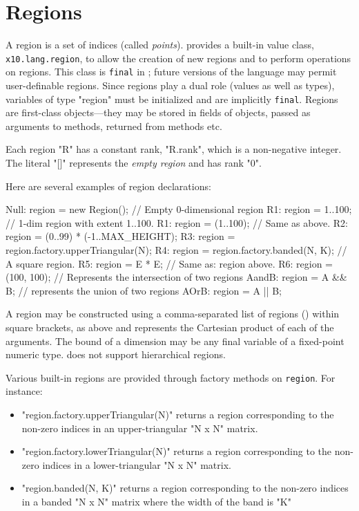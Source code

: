 \section{Regions}\label{XtenRegions}


A region is a set of indices (called {\em points}).  {}\Xten{}
provides a built-in value class, {\tt x10.lang.region}, to allow the
creation of new regions and to perform operations on regions. This
class is {\tt final} in {}\XtenCurrVer; future versions of the
language may permit user-definable regions. Since regions play a dual
role (values as well as types), variables of type \xcd"region" must be
initialized and are implicitly {\tt final}. Regions are first-class
objects---they may be stored in fields of objects, passed as
arguments to methods, returned from methods etc.

Each region \xcd"R" has a constant rank, \xcd"R.rank", which is a
non-negative integer. The literal \xcd"[]" represents the {\em empty
region} and has rank \xcd"0".

Here are several examples of region declarations:
\begin{xten}
Null: region = new Region();  // Empty 0-dimensional region          
R1: region = 1..100; // 1-dim region with extent 1..100.
R1: region = (1..100); // Same as above.
R2: region = (0..99) * (-1..MAX_HEIGHT);   
R3: region = region.factory.upperTriangular(N);
R4: region = region.factory.banded(N, K);
   // A square region.
R5: region = E * E;           
   // Same as: region above.
R6: region = (100, 100);       
   // Represents the intersection of two regions
AandB: region = A && B;       
  // represents the union of two regions
AOrB: region = A || B;        
\end{xten}

A region may be constructed using a comma-separated list of regions
() within square brackets, as above and represents
the Cartesian product of each of the arguments.  The bound of a
dimension may be any final variable of a fixed-point numeric
type. \XtenCurrVer{} does not support hierarchical regions.

Various built-in regions are provided through  factory
methods on {\tt region}.  For instance:
\begin{itemize}
{}\item \xcd"region.factory.upperTriangular(N)" returns a region corresponding
to the non-zero indices in an upper-triangular \xcd"N x N" matrix.
{}\item \xcd"region.factory.lowerTriangular(N)" returns a region corresponding
to the non-zero indices in a lower-triangular \xcd"N x N" matrix.
{}\item \xcd"region.banded(N, K)" returns a region corresponding to
the non-zero indices in a banded \xcd"N x N" matrix where the width of
the band is \xcd"K"
\end{itemize}

